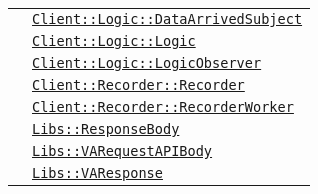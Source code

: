 \begin{longtable}{|>{\centering}m{3cm}|m{10cm}<{\centering}|}
& \hyperref[Client::Logic::DataArrivedSubject]{\texttt{Client::Logic::DataArrivedSubject}}\\
& \hyperref[Client::Logic::Logic]{\texttt{Client::Logic::Logic}}\\
& \hyperref[Client::Logic::LogicObserver]{\texttt{Client::Logic::LogicObserver}}\\
& \hyperref[Client::Recorder::Recorder]{\texttt{Client::Recorder::Recorder}}\\
& \hyperref[Client::Recorder::RecorderWorker]{\texttt{Client::Recorder::RecorderWorker}}\\
& \hyperref[Libs::ResponseBody]{\texttt{Libs::ResponseBody}}\\
& \hyperref[Libs::VARequestAPIBody]{\texttt{Libs::VARequestAPIBody}}\\
& \hyperref[Libs::VAResponse]{\texttt{Libs::VAResponse}}\\ \hline


\end{longtable}
